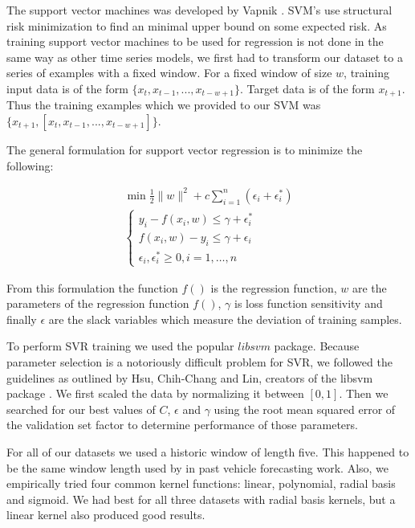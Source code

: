 The support vector machines was developed by Vapnik \cite{Vapnik1998}.  SVM's use structural risk minimization to find an minimal upper bound on some expected risk.  As training support vector machines to be used for regression is not done in the same way as other time series models, we first had to transform our dataset to a series of examples with a fixed window.  For a fixed window of size $w$, training input data is of the form $\{x_{t}, x_{t - 1}, ..., x_{t - w + 1}\}$.  Target data is of the form $x_{t + 1}$.  Thus the training examples which we provided to our SVM was $\{x_{t + 1}, [x_{t}, x_{t - 1}, ..., x_{t - w + 1}]\}$.

The general formulation for support vector regression is to minimize the following:

\begin{equation}
	\begin{split}
	\min \frac{1}{2}\|w\|^{2} + c \sum_{i = 1}^{n}(\epsilon_{i} + \epsilon^{*}_{i}) \\
	\begin{cases}
		y_{i} - f(x_{i}, w) \le \gamma + \epsilon^{*}_{i} \\
		f(x_{i}, w) - y_{i} \le \gamma + \epsilon_{i} \\
		\epsilon_{i}, \epsilon_{i}^{*} \ge 0, i = 1, \ldots, n
	\end{cases}
	\end{split}
\end{equation}

From this formulation the function $f()$ is the regression function, $w$ are the parameters of the regression function $f()$, $\gamma$ is loss function sensitivity and finally $\epsilon$ are the slack variables which measure the deviation of training samples.  

To perform SVR training we used the popular $libsvm$ package.  Because parameter selection is a notoriously difficult problem for SVR, we followed the guidelines as outlined by Hsu, Chih-Chang and Lin, creators of the libsvm package \cite{Hsu2003}.  We first scaled the data by normalizing it between $[0, 1]$.  Then we searched for our best values of $C$, $\epsilon$ and $\gamma$ using the root mean squared error of the validation set factor to determine performance of those parameters. 

For all of our datasets we used a historic window of length five.  This happened to be the same window length used by \cite{Wu2004} in past vehicle forecasting work.  Also, we empirically tried four common kernel functions: linear, polynomial, radial basis and sigmoid.  We had best for all three datasets with radial basis kernels, but a linear kernel also produced good results.
